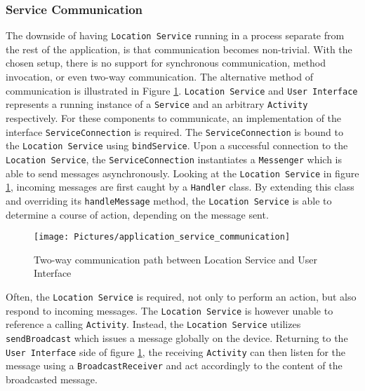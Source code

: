 \subsubsection{Service Communication}\label{subsubsec:service_communication}
The downside of having \texttt{Location Service} running in a process separate from the rest of the application, is that communication becomes non-trivial. With the chosen setup, there is no support for synchronous communication, method invocation, or even two-way communication. The alternative method of communication is illustrated in Figure \ref{fig:application_service_communication}. \texttt{Location Service} and \texttt{User Interface} represents a running instance of a \texttt{Service} and an arbitrary \texttt{Activity} respectively. For these components to communicate, an implementation of the interface \texttt{ServiceConnection} is required\citep{android_serviceconnection}.  The \texttt{ServiceConnection} is bound to the \texttt{Location Service} using \texttt{bindService}\citep{android_bindservice}. Upon a successful connection to the \texttt{Location Service}, the \texttt{ServiceConnection} instantiates a \texttt{Messenger}\citep{android_messenger} which is able to send messages asynchronously. Looking at the \texttt{Location Service} in figure \ref{fig:application_service_communication}, incoming messages are first caught by a \texttt{Handler}\citep{android_handler} class. By extending this class and overriding its \texttt{handleMessage} method, the \texttt{Location Service} is able to determine a course of action, depending on the message sent.

\begin{figure}[tb]
\centering
\texttt{[image: Pictures/application\_service\_communication]}
\caption{Two-way communication path between Location Service and User Interface}
\label{fig:application_service_communication}
\end{figure}

Often, the \texttt{Location Service} is required, not only to perform an action, but also respond to incoming messages. The \texttt{Location Service} is however unable to reference a calling \texttt{Activity}. Instead, the \texttt{Location Service} utilizes \texttt{sendBroadcast}\citep{android_sendbroadcast} which issues a message globally on the device. Returning to the \texttt{User Interface} side of figure \ref{fig:application_service_communication}, the receiving \texttt{Activity} can then listen for the message using a \texttt{BroadcastReceiver}\citep{android_broadcastreceiver} and act accordingly to the content of the broadcasted message. 


